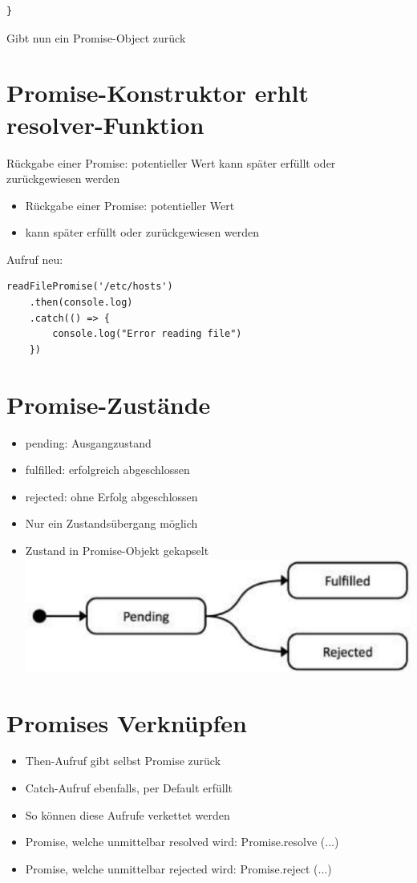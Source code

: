 \documentclass[10pt]{article}
\begin{document}
\begin{verbatim}
}
\end{verbatim}

Gibt nun ein Promise-Object zurück

\section*{Promise-Konstruktor erhlt resolver-Funktion}
Rückgabe einer Promise: potentieller Wert kann später erfüllt oder zurückgewiesen werden

\begin{itemize}
  \item Rückgabe einer Promise: potentieller Wert
  \item kann später erfüllt oder zurückgewiesen werden
\end{itemize}

Aufruf neu:

\begin{verbatim}
readFilePromise('/etc/hosts')
    .then(console.log)
    .catch(() => {
        console.log("Error reading file")
    })
\end{verbatim}

\section*{Promise-Zustände}
\begin{itemize}
  \item pending: Ausgangzustand
  \item fulfilled: erfolgreich abgeschlossen
  \item rejected: ohne Erfolg abgeschlossen
  \item Nur ein Zustandsübergang möglich
  \item Zustand in Promise-Objekt gekapselt\\
\includegraphics[max width=\textwidth, center]{2024_12_29_858f09cde51177c71657g-14}
\end{itemize}

\section*{Promises Verknüpfen}
\begin{itemize}
  \item Then-Aufruf gibt selbst Promise zurück
  \item Catch-Aufruf ebenfalls, per Default erfüllt
  \item So können diese Aufrufe verkettet werden
  \item Promise, welche unmittelbar resolved wird: Promise.resolve (...)
  \item Promise, welche unmittelbar rejected wird: Promise.reject (...)
\end{itemize}
\end{document}
